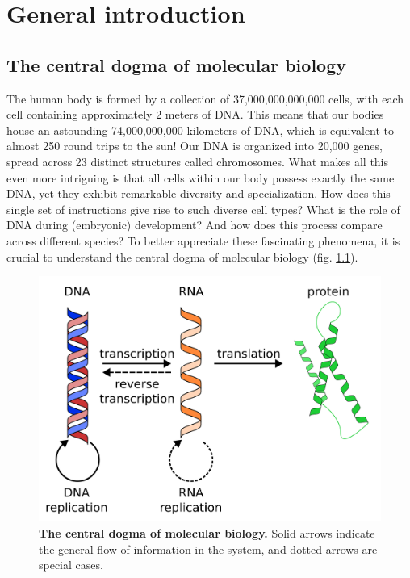 \chapter{General introduction}\thumbforchapter
\newpage

\section{The central dogma of molecular biology}

The human body is formed by a collection of 37,000,000,000,000 cells\cite{Bianconi2013}, with each cell containing approximately 2 meters of DNA. This means that our bodies house an astounding 74,000,000,000 kilometers of DNA, which is equivalent to almost 250 round trips to the sun! Our DNA is organized into 20,000 genes, spread across 23 distinct structures called chromosomes. What makes all this even more intriguing is that all cells within our body possess exactly the same DNA, yet they exhibit remarkable diversity and specialization. How does this single set of instructions give rise to such diverse cell types? What is the role of DNA during (embryonic) development? And how does this process compare across different species? To better appreciate these fascinating phenomena, it is crucial to understand the central dogma of molecular biology (fig. \ref{fig:central_dogma}).

\begin{figure}[H]
    \includegraphics[width=\linewidth]{ch.introduction/imgs/central_dogma.png}
    \caption{\textbf{The central dogma of molecular biology.} Solid arrows indicate the general flow of information in the system, and dotted arrows are special cases.}
    \label{fig:central_dogma}
\end{figure}


